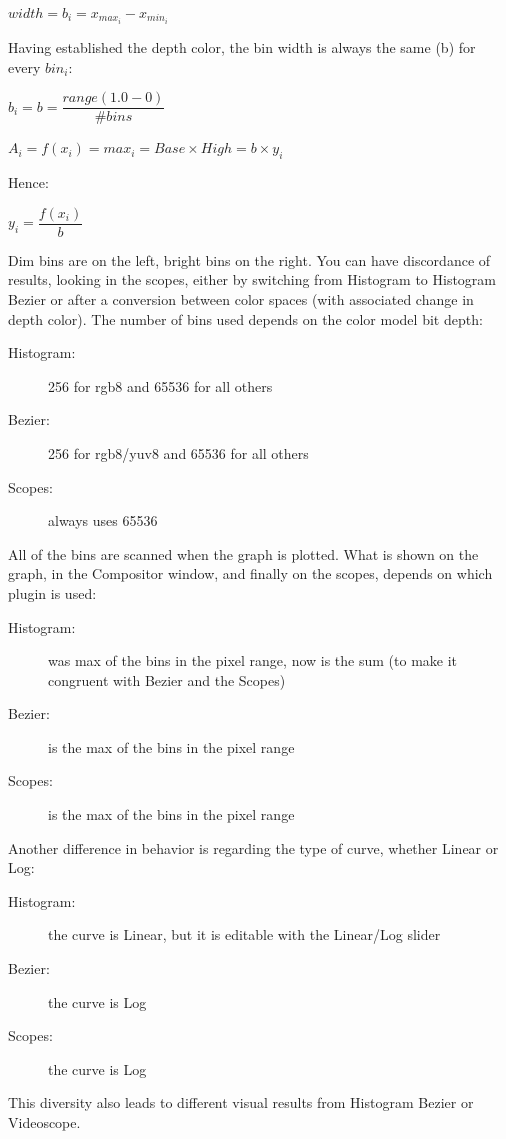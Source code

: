 $width = b_i = x_{max_i} - x_{min_i}$

Having established the depth color, the bin width is always the same (b) for every $bin_i$:

$b_i = b = \dfrac{range(1.0-0)}{\# bins}$

$A_i = f(x_i) = max_i = Base \times High = b \times y_i$

Hence:

$y_i = \dfrac{f(x_i)}{b}$

Dim bins are on the left, bright bins on the right.
You can have discordance of results, looking in the scopes, either by switching from Histogram to Histogram Bezier or after a conversion between color spaces (with associated change in depth color). The number of bins used depends on the color model bit depth:

\begin{description}
	\item[Histogram:] 256 for rgb8 and 65536 for all others
	\item[Bezier:] 256 for rgb8/yuv8 and 65536 for all others
	\item[Scopes:] always uses 65536
\end{description}

All of the bins are scanned when the graph is plotted.  What is shown on the graph, in the Compositor window, and finally on the scopes, depends on which plugin is used:

\begin{description}
	\item[Histogram:] was max of the bins in the pixel range, now is the sum (to make it congruent with Bezier and the Scopes)
	\item[Bezier:] is the max of the bins in the pixel range
	\item[Scopes:] is the max of the bins in the pixel range
\end{description}

Another difference in behavior is regarding the type of curve, whether Linear or Log:

\begin{description}
	\item[Histogram:] the curve is Linear, but it is editable with the Linear/Log slider
	\item[Bezier:] the curve is Log
	\item[Scopes:] the curve is Log
\end{description}

This diversity also leads to different visual results from Histogram Bezier or Videoscope.


